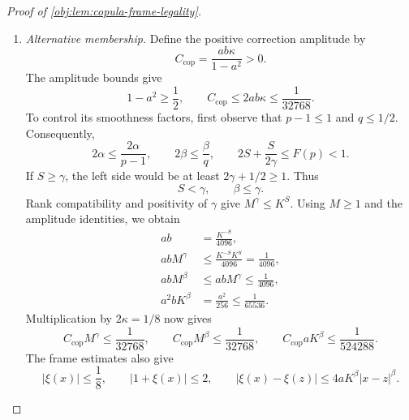 \documentclass[11pt]{article}
\begin{document}
\begin{proof}[Proof of \cref{obj:lem:copula-frame-legality}]
\begin{enumerate}
The membership calculation applies to valid construction inputs satisfying
\[
\varepsilon Lu=b,\qquad \varepsilon L^p\le10.
\]
In the null branch, the table identities reduce to
\[
e_P(x)=\frac{1+a\mathcal F_\lambda(x)}2,
\qquad
m_{0,P}(x)=b\mathcal F_\eta(x),
\qquad
\tau_P(x)=0.
\]
The frame envelope and amplitude bounds imply
\[
|\xi(x)|\le a\sqrt2\le\frac18,\qquad
\frac14\le e_P(x)\le\frac34,\qquad
|m_{0,P}(x)|\le b\sqrt2\le\frac12.
\]
The frame Hölder estimates, together with the amplitude-power identities, give
\[
\begin{aligned}
|e_P(x)-e_P(z)|
&\le2aK^\alpha|x-z|^\alpha
=\frac18|x-z|^\alpha
\le20|x-z|^\alpha,\\
|m_{0,P}(x)-m_{0,P}(z)|
&\le4bK^\beta|x-z|^\beta
=\frac1{64}|x-z|^\beta
\le20|x-z|^\beta.
\end{aligned}
\]
The effect is continuous, has supremum norm zero, and has zero Hölder differences. These estimates establish
\cref{obj:ass:overlap,obj:ass:propensity-smoothness,obj:ass:baseline-smoothness,obj:ass:effect-smoothness,obj:ass:baseline-cap,obj:ass:effect-cap}.
The normalized conditional table is integrated against \(\lambda\), so
\(P_X=\lambda\), as required by \cref{obj:ass:uniform}. The exact conditional-moment formula yields
\[
\int_{\mathbb R}|y|^p Q_{(1+\ell)/2,P}(dy\mid x)
=\varepsilon L^p\le10,
\]
and hence \cref{obj:ass:raw-moment}. Finally, \(\tau_P=0\) supplies
\cref{obj:ass:null-constancy} with constant zero. Therefore
\(P\in H_0(v)\) by \cref{obj:def:null}. The finite-moment tuning satisfies the two displayed input conditions by the first step.

\item \textit{Alternative membership.}
Define the positive correction amplitude by
\[
C_{\mathrm{cop}}=\frac{ab\kappa}{1-a^2}>0.
\]
The amplitude bounds give
\[
1-a^2\ge\frac12,\qquad
C_{\mathrm{cop}}\le2ab\kappa\le\frac1{32768}.
\]
To control its smoothness factors, first observe that \(p-1\le1\) and \(q\le1/2\). Consequently,
\[
2\alpha\le\frac{2\alpha}{p-1},
\qquad
2\beta\le\frac{\beta}{q},
\qquad
2S+\frac{S}{2\gamma}\le F(p)<1.
\]
If \(S\ge\gamma\), the left side would be at least
\(2\gamma+1/2\ge1\). Thus
\[
S<\gamma,\qquad \beta\le\gamma.
\]
Rank compatibility and positivity of \(\gamma\) give
\(M^\gamma\le K^S\). Using \(M\ge1\) and the amplitude identities, we obtain
\[
\begin{aligned}
ab&=\frac{K^{-S}}{4096},\\
abM^\gamma&\le\frac{K^{-S}K^S}{4096}=\frac1{4096},\\
abM^\beta&\le abM^\gamma\le\frac1{4096},\\
a^2bK^\beta&=\frac{a^2}{256}\le\frac1{65536}.
\end{aligned}
\]
Multiplication by \(2\kappa=1/8\) now gives
\[
C_{\mathrm{cop}}M^\gamma\le\frac1{32768},
\qquad
C_{\mathrm{cop}}M^\beta\le\frac1{32768},
\qquad
C_{\mathrm{cop}}aK^\beta\le\frac1{524288}.
\]
The frame estimates also give
\[
|\xi(x)|\le\frac18,\qquad
|1+\xi(x)|\le2,\qquad
|\xi(x)-\xi(z)|
\le4aK^\beta|x-z|^\beta.
\]


\end{enumerate}
\end{proof}
\end{document}

